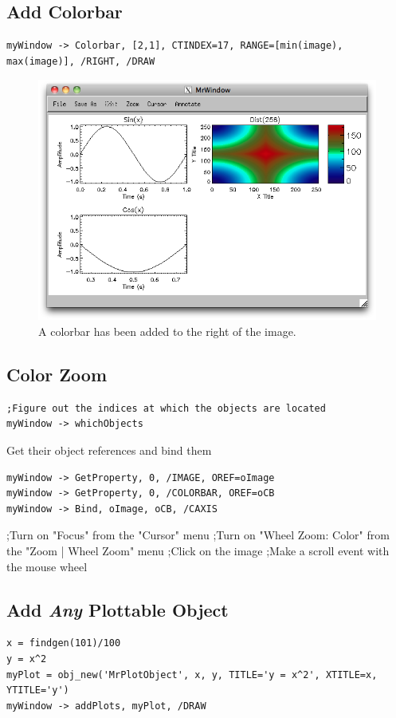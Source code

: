 \documentclass[12pt, letterpaper, oneside]{article}		%
\begin{document}
\subsection{Add Colorbar}

\begin{lstlisting}
myWindow -> Colorbar, [2,1], CTINDEX=17, RANGE=[min(image), max(image)], /RIGHT, /DRAW
\end{lstlisting}

\begin{figure}[h!]
	\centering
	\includegraphics[width=0.5 \textwidth]{./figures/Add-Colorbar.png}
	\caption[Add a Colorbar.]
	{A colorbar has been added to the right of the image.}
\end{figure}

\subsection{Color Zoom}

\begin{lstlisting}
;Figure out the indices at which the objects are located
myWindow -> whichObjects
\end{lstlisting}
    
Get their object references and bind them

\begin{lstlisting}
myWindow -> GetProperty, 0, /IMAGE, OREF=oImage
myWindow -> GetProperty, 0, /COLORBAR, OREF=oCB
myWindow -> Bind, oImage, oCB, /CAXIS
\end{lstlisting}
    
    ;Turn on "Focus" from the "Cursor" menu
    ;Turn on "Wheel Zoom: Color" from the "Zoom | Wheel Zoom" menu
    ;Click on the image
    ;Make a scroll event with the mouse wheel
    
\subsection{Add \emph{Any} Plottable Object}

\begin{lstlisting}
x = findgen(101)/100
y = x^2
myPlot = obj_new('MrPlotObject', x, y, TITLE='y = x^2', XTITLE=x, YTITLE='y')
myWindow -> addPlots, myPlot, /DRAW
\end{lstlisting}
 
\end{document}
